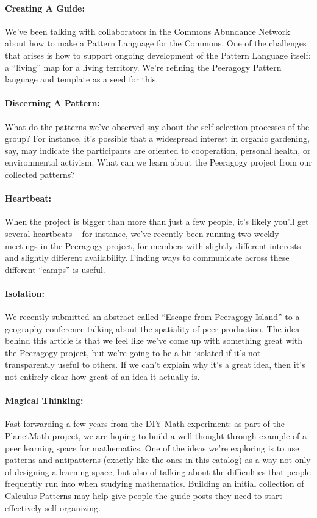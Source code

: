 \paragraph{Creating A Guide:} We’ve been talking with collaborators in the Commons Abundance Network
about how to make a Pattern Language for the Commons. One of the
challenges that arises is how to support ongoing development of the
Pattern Language itself: a “living” map for a living territory. We’re
refining the Peeragogy Pattern language and template as a seed for this.

\paragraph{Discerning A Pattern:} What do the patterns we’ve observed say about the self-selection
processes of the group? For instance, it’s possible that a widespread
interest in organic gardening, say, may indicate the participants are
oriented to cooperation, personal health, or environmental activism.
What can we learn about the Peeragogy project from our collected
patterns?

\paragraph{Heartbeat:} When the project is bigger than more than just a few people, it’s likely
you’ll get several heartbeats – for instance, we’ve recently been
running two weekly meetings in the Peeragogy project, for members with
slightly different interests and slightly different availability.
Finding ways to communicate across these different “camps” is useful.

\paragraph{Isolation:} We recently submitted an abstract called “Escape from Peeragogy Island”
to a geography conference talking about the spatiality of peer
production. The idea behind this article is that we feel like we’ve come
up with something great with the Peeragogy project, but we’re going to
be a bit isolated if it’s not transparently useful to others. If we
can’t explain why it’s a great idea, then it’s not entirely clear how
great of an idea it actually is.

\paragraph{Magical Thinking:}  Fast-forwarding a few years from the DIY Math experiment: as part of the
PlanetMath project, we are hoping to build a well-thought-through
example of a peer learning space for mathematics. One of the ideas we’re
exploring is to use patterns and antipatterns (exactly like the ones in
this catalog) as a way not only of designing a learning space, but also
of talking about the difficulties that people frequently run into when
studying mathematics. Building an initial collection of Calculus
Patterns may help give people the guide-posts they need to start
effectively self-organizing.

